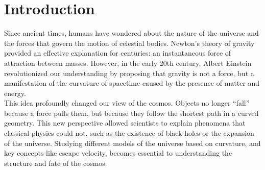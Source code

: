 \documentclass{aleph-revista}
\begin{document}
\membrete
\section{Introduction}
Since ancient times, humans have wondered about the nature of the universe and the forces that govern the motion of celestial bodies. Newton's theory of gravity provided an effective explanation for centuries: an instantaneous force of attraction between masses. However, in the early 20th century, Albert Einstein revolutionized our understanding by proposing that gravity is not a force, but a manifestation of the curvature of spacetime caused by the presence of matter and energy.\\
This idea profoundly changed our view of the cosmos. Objects no longer “fall” because a force pulls them, but because they follow the shortest path in a curved geometry. This new perspective allowed scientists to explain phenomena that classical physics could not, such as the existence of black holes or the expansion of the universe. Studying different models of the universe based on curvature, and key concepts like escape velocity, becomes essential to understanding the structure and fate of the cosmos.
\end{document}
